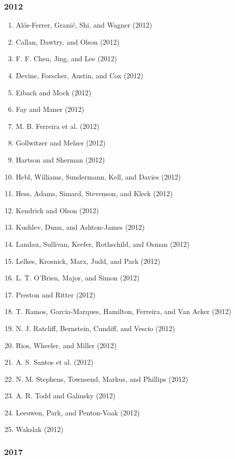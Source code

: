 \documentclass[english,man]{apa6}
\providecommand{\tightlist}{%
  \setlength{\itemsep}{0pt}\setlength{\parskip}{0pt}}
\theoremstyle{definition}
\theoremstyle{definition}
\theoremstyle{definition}
\theoremstyle{remark}
\begin{document}
\subsubsection{2012}\label{section-46}

\begin{enumerate}
\def\labelenumi{\arabic{enumi})}
\tightlist
\item
  Alós-Ferrer, Granić, Shi, and Wagner (2012)
\item
  Callan, Dawtry, and Olson (2012)
\item
  F. F. Chen, Jing, and Lee (2012)
\item
  Devine, Forscher, Austin, and Cox (2012)
\item
  Eibach and Mock (2012)
\item
  Fay and Maner (2012)
\item
  M. B. Ferreira et al. (2012)
\item
  Gollwitzer and Melzer (2012)
\item
  Hartson and Sherman (2012)
\item
  Hebl, Williams, Sundermann, Kell, and Davies (2012)
\item
  Hess, Adams, Simard, Stevenson, and Kleck (2012)
\item
  Kendrick and Olson (2012)
\item
  Kushlev, Dunn, and Ashton-James (2012)
\item
  Landau, Sullivan, Keefer, Rothschild, and Osman (2012)
\item
  Lelkes, Krosnick, Marx, Judd, and Park (2012)
\item
  L. T. O'Brien, Major, and Simon (2012)
\item
  Preston and Ritter (2012)
\item
  T. Ramos, Garcia-Marques, Hamilton, Ferreira, and Van Acker (2012)
\item
  N. J. Ratcliff, Bernstein, Cundiff, and Vescio (2012)
\item
  Rios, Wheeler, and Miller (2012)
\item
  A. S. Santos et al. (2012)
\item
  N. M. Stephens, Townsend, Markus, and Phillips (2012)
\item
  A. R. Todd and Galinsky (2012)
\item
  Leeuwen, Park, and Penton-Voak (2012)
\item
  Wakslak (2012)
\end{enumerate}

\subsubsection{2017}\label{section-47}
\end{document}
